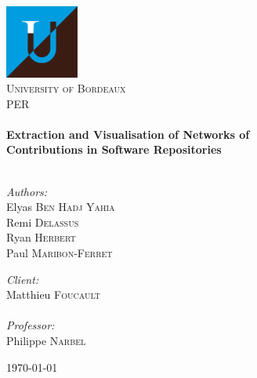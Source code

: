 \begin{titlepage}
\begin{center}

\includegraphics[width=0.18\textwidth]{./resources/ub.png}~\\[1cm]

\textsc{\LARGE University of Bordeaux}\\[1.5cm]

\textsc{\Large {PER}}\\[0.5cm]

\HRule \\[0.4cm]
{ \huge \bfseries Extraction and Visualisation of Networks of \\[0.2cm]Contributions in Software Repositories}\\[0.4cm]

\HRule \\[1.5cm]

\begin{minipage}{0.4\textwidth}
\begin{flushleft} \large
\emph{Authors:} \\
Elyas \textsc{Ben Hadj Yahia}\\
Remi \textsc{Delassus}\\
Ryan \textsc{Herbert}\\
Paul \textsc{Maribon-Ferret}\\
\end{flushleft}
\end{minipage}
\begin{minipage}{0.4\textwidth}
\begin{flushright} \large
\emph{Client:} \\
Matthieu \textsc{Foucault}\\
\emph{\\Professor:} \\
Philippe \textsc{Narbel}
\end{flushright}
\end{minipage}

\vfill

{\large \today}

\end{center}
\end{titlepage}
